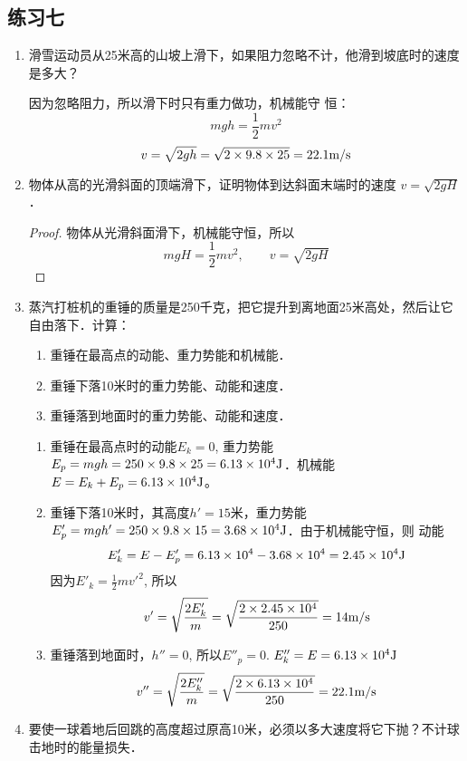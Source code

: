 \subsection{练习七}
\begin{enumerate}
    \item 滑雪运动员从25米高的山坡上滑下，如果阻力忽略不计，他滑到坡底时的速度是多大？

    \begin{solution}
        因为忽略阻力，所以滑下时只有重力做功，机械能守
        恒：
\[    mgh=\frac{1}{2}mv^2\]
      \[  v=\sqrt{2gh}=\sqrt{2\times9.8\times25}=22.1\text{m}/\text{s}\]
    \end{solution}
    \item 物体从高的光滑斜面的顶端滑下，证明物体到达斜面末端时的速度 $v=\sqrt{2gH}$．

    \begin{proof}
        物体从光滑斜面滑下，机械能守恒，所以
        \[mgH=\frac{1}{2}mv^2,\qquad v=\sqrt{2gH}\]
    \end{proof}
    \item 蒸汽打桩机的重锤的质量是250千克，把它提升到离地面25米高处，然后让它自由落下．计算：
    \begin{enumerate}
        \item 重锤在最高点的动能、重力势能和机械能．
        \item 重锤下落10米时的重力势能、动能和速度．
        \item 重锤落到地面时的重力势能、动能和速度．
    \end{enumerate}

    \begin{solution}
\begin{enumerate}
    \item 重锤在最高点时的动能$E_k=0$, 重力势能$E_p=
    mgh=250\times9.8\times25=6.13\times10^4{\rm J}$．机械能$E=E_k+E_p=
    6.13\times10^4{\rm J}$。
    \item 重锤下落10米时，其高度$h'=15$米，重力势能$E'_p=
    mgh'=250\times9.8\times15=3.68\times10^4{\rm J}$．由于机械能守恒，则
    动能
    \[E'_k=E-E'_p=6.13\times10^4-3.68\times10^4=2.45\times10^4{\rm J}\]
    因为$E'_k=\frac{1}{2}m{v'}^2$, 所以
\[v'=\sqrt{\frac{2E_k'}{m}}=\sqrt{\frac{2\times 2.45\times 10^4}{250}}=14\text{m}/\text{s}\]
    \item 重锤落到地面时，$h''=0$, 所以$E''_p=0$.
    $E''_k=E=6.13\times10^4{\rm J}$
    \[v''=\sqrt{\frac{2E_k''}{m}}=\sqrt{\frac{2\times 6.13\times 10^4}{250}}=22.1\text{m}/\text{s}\]
\end{enumerate}
    \end{solution}
\item 要使一球着地后回跳的高度超过原高10米，必须以多大速度将它下抛？不计球击地时的能量损失．


\end{enumerate}
